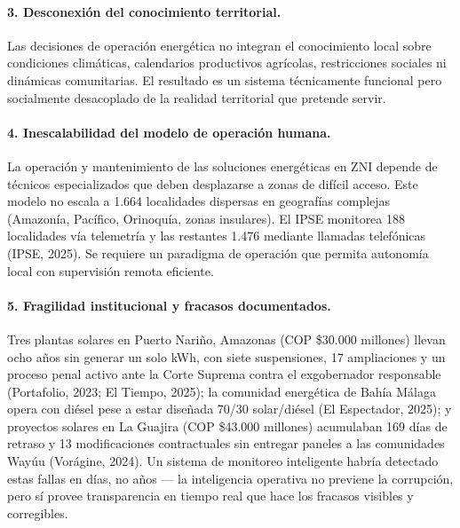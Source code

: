 \documentclass[12pt,letterpaper]{article}
\begin{document}
\paragraph{3. Desconexi\'on del conocimiento territorial.}
Las decisiones de operaci\'on energ\'etica no integran el conocimiento local sobre condiciones clim\'aticas, calendarios productivos agr\'icolas, restricciones sociales ni din\'amicas comunitarias. El resultado es un sistema t\'ecnicamente funcional pero socialmente desacoplado de la realidad territorial que pretende servir.

\paragraph{4. Inescalabilidad del modelo de operaci\'on humana.}
La operaci\'on y mantenimiento de las soluciones energ\'eticas en ZNI depende de t\'ecnicos especializados que deben desplazarse a zonas de dif\'icil acceso. Este modelo no escala a 1.664 localidades dispersas en geograf\'ias complejas (Amazon\'ia, Pac\'ifico, Orinoqu\'ia, zonas insulares). El IPSE monitorea 188 localidades v\'ia telemetr\'ia y las restantes 1.476 mediante llamadas telef\'onicas (IPSE, 2025). Se requiere un paradigma de operaci\'on que permita autonom\'ia local con supervisi\'on remota eficiente.

\paragraph{5. Fragilidad institucional y fracasos documentados.}
Tres plantas solares en Puerto Nari\~no, Amazonas (COP \$30.000 millones) llevan ocho a\~nos sin generar un solo kWh, con siete suspensiones, 17 ampliaciones y un proceso penal activo ante la Corte Suprema contra el exgobernador responsable (Portafolio, 2023; El Tiempo, 2025); la comunidad energ\'etica de Bah\'ia M\'alaga opera con di\'esel pese a estar dise\~nada 70/30 solar/di\'esel (El Espectador, 2025); y proyectos solares en La Guajira (COP \$43.000 millones) acumulaban 169 d\'ias de retraso y 13 modificaciones contractuales sin entregar paneles a las comunidades Way\'uu (Vor\'agine, 2024). Un sistema de monitoreo inteligente habr\'ia detectado estas fallas en d\'ias, no a\~nos --- la inteligencia operativa no previene la corrupci\'on, pero s\'i provee transparencia en tiempo real que hace los fracasos visibles y corregibles.

\medskip
\end{document}
